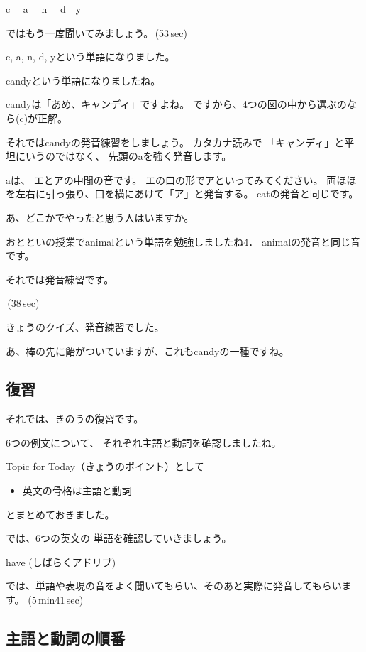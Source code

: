 \documentclass[12pt]{jlreq}
\begin{document}
c\,\,
{\large \ComputerMouse}\,\,
a\,\,
{\large \ComputerMouse}\,\,
n\,\,
{\large \ComputerMouse}\,\,
d
{\large \ComputerMouse}\,\,
y

ではもう一度聞いてみましょう。\faVolumeUp\,(53\,sec)


c, a, n, d, yという単語になりました。

candyという単語になりましたね。

candyは「あめ、キャンディ」ですよね。
ですから、4つの図の中から選ぶのなら(c)が正解。

それではcandyの発音練習をしましょう。
カタカナ読みで
「キャンディ」と平坦にいうのではなく、
先頭のaを強く発音します。

aは、
エとアの中間の音です。
エの口の形でアといってみてください。
両ほほを左右に引っ張り、口を横にあけて「ア」と発音する。
catの発音と同じです。

あ、どこかでやったと思う人はいますか。

おとといの授業でanimalという単語を勉強しましたね4．
animalの発音と同じ音です。

それでは発音練習です。

\faVolumeUp\,(38\,sec)

きょうのクイズ、発音練習でした。

{\large \ComputerMouse}


あ、棒の先に飴がついていますが、これもcandyの一種ですね。

{\large \ComputerMouse}

\subsection{復習}


それでは、きのうの復習です。

6つの例文について、
それぞれ主語と動詞を確認しましたね。

Topic for Today（きょうのポイント）として
\begin{itemize}
 \item 英文の骨格は主語と動詞
\end{itemize}
とまとめておきました。

では、6つの英文の
単語を確認していきましょう。

have
(しばらくアドリブ)

では、単語や表現の音をよく聞いてもらい、そのあと実際に発音してもらいます。
(5\,min41\,sec)


\subsection{主語と動詞の順番}
\end{document}
